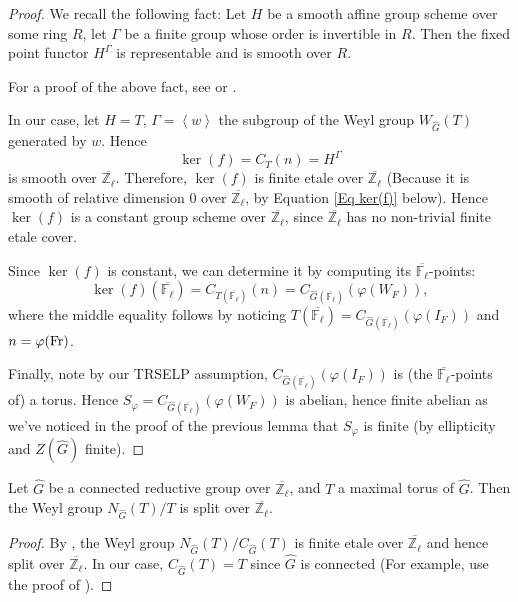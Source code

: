 \begin{proof}
	We recall the following fact: Let $H$ be a smooth affine group scheme over some ring $R$, let $\Gamma$ be a finite group whose order is invertible in $R$. Then the fixed point functor $H^{\Gamma}$ is representable and is smooth over $R$.
	
	For a proof of the above fact, see \cite[Proposition 3.4]{edixhoven1992neron} or \cite[Lemma A.1, A.13]{dhkm2020moduli}.
	
	In our case, let $H=T$, $\Gamma=\left<w\right>$ the subgroup of the Weyl group $W_{\hat{G}}(T)$ generated by $w$. Hence $$\ker(f)=C_T(n)=H^{\Gamma}$$
    is smooth over $\overline{\mathbb{Z}_{\ell}}$. Therefore, $\ker(f)$ is finite etale over $\overline{\mathbb{Z}_{\ell}}$ (Because it is smooth of relative dimension $0$ over $\overline{\mathbb{Z}_{\ell}}$, by Equation \eqref{Eq ker(f)} below). Hence $\ker(f)$ is a constant group scheme over $\overline{\mathbb{Z}_{\ell}}$, since $\overline{\mathbb{Z}_{\ell}}$ has no non-trivial finite etale cover.
	
	Since $\ker(f)$ is constant, we can determine it by computing its $\overline{\mathbb{F}_{\ell}}$-points:
	\begin{equation}\label{Eq ker(f)}
	\ker(f)(\overline{\mathbb{F}_{\ell}})=C_{T(\overline{\mathbb{F}_{\ell}})}(n)=C_{\hat{G}(\overline{\mathbb{F}_{\ell}})}(\varphi(W_F)),
	\end{equation}
	where the middle equality follows by noticing $T(\overline{\mathbb{F}_{\ell}})=C_{\hat{G}(\overline{\mathbb{F}_{\ell}})}(\varphi(I_F))$ and $n=\varphi(\operatorname{Fr})$.
	
	Finally, note by our TRSELP assumption, $C_{\hat{G}(\overline{\mathbb{F}_{\ell}})}(\varphi(I_F))$ is (the $\overline{\mathbb{F}_{\ell}}$-points of) a torus. Hence $S_{\varphi}=C_{\hat{G}(\overline{\mathbb{F}_{\ell}})}(\varphi(W_F))$ is abelian, hence finite abelian as we've noticed in the proof of the previous lemma that $S_\varphi$ is finite (by ellipticity and $Z(\hat{G})$ finite).
\end{proof}

\begin{lemma}\label{Lem Wely}
	Let $\hat{G}$ be a connected reductive group over $\overline{\mathbb{Z}_{\ell}}$, and $T$ a maximal torus of $\hat{G}$. Then the Weyl group $N_{\hat{G}}(T)/T$ is split over $\overline{\mathbb{Z}_{\ell}}$.
\end{lemma}

\begin{proof}
	By \cite[Proposition 3.2.8]{conrad2014reductive}, the Weyl group $N_{\hat{G}}(T)/C_{\hat{G}}(T)$ is finite etale over $\overline{\mathbb{Z}_{\ell}}$ and hence split over $\overline{\mathbb{Z}_{\ell}}$. In our case, $C_{\hat{G}}(T)=T$ since $\hat{G}$ is connected (For example, use the proof of \cite[Theorem 3.1.12]{conrad2014reductive}).
\end{proof}
	

